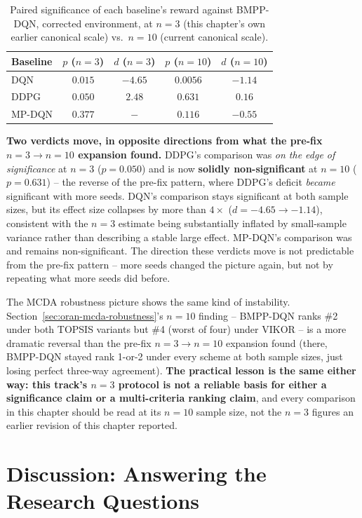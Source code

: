 \begin{table}[h]
\centering
\caption{Paired significance of each baseline's reward against BMPP-DQN,
  corrected environment, at $n=3$ (this chapter's own earlier
  canonical scale) vs.\ $n=10$ (current canonical scale).}
\label{tab:oran-n3-vs-n10}
\begin{tabular}{lcccc}
\hline
Baseline & $p$ ($n=3$) & $d$ ($n=3$) & $p$ ($n=10$) & $d$ ($n=10$) \\
\hline
DQN & $0.015$ & $-4.65$ & $0.0056$ & $-1.14$ \\
DDPG & $0.050$ & $2.48$ & $0.631$ & $0.16$ \\
MP-DQN & $0.377$ & $-$ & $0.116$ & $-0.55$ \\
\hline
\end{tabular}
\end{table}

\textbf{Two verdicts move, in opposite directions from what the
pre-fix $n=3\to n=10$ expansion found.} DDPG's comparison was
\emph{on the edge of significance} at $n=3$ ($p=0.050$) and is now
\textbf{solidly non-significant} at $n=10$ ($p=0.631$) -- the reverse of
the pre-fix pattern, where DDPG's deficit \emph{became} significant with
more seeds. DQN's comparison stays significant at both sample sizes, but
its effect size collapses by more than $4\times$ ($d=-4.65 \to -1.14$),
consistent with the $n=3$ estimate being substantially inflated by
small-sample variance rather than describing a stable large effect.
MP-DQN's comparison was and remains non-significant. The direction these
verdicts move is not predictable from the pre-fix pattern -- more seeds
changed the picture again, but not by repeating what more seeds did
before.

The MCDA robustness picture shows the same kind of instability.
Section~\ref{sec:oran-mcda-robustness}'s $n=10$ finding -- BMPP-DQN
ranks \#2 under both TOPSIS variants but \#4 (worst of four) under VIKOR
-- is a more dramatic reversal than the pre-fix $n=3\to n=10$ expansion
found (there, BMPP-DQN stayed rank 1-or-2 under every scheme at both
sample sizes, just losing perfect three-way agreement). \textbf{The
practical lesson is the same either way: this track's $n=3$ protocol is
not a reliable basis for either a significance claim or a multi-criteria
ranking claim}, and every comparison in this chapter should be read at
its $n=10$ sample size, not the $n=3$ figures an earlier revision of
this chapter reported.

\section{Discussion: Answering the Research Questions}
\label{sec:oran-rq-answers}

